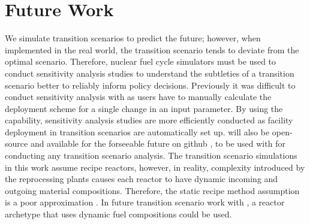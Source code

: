 \section{Future Work}
We simulate transition scenarios to predict the future; 
however, when implemented in the real world, the transition 
scenario tends to deviate from the optimal scenario.
Therefore, nuclear fuel cycle simulators must be used to conduct
sensitivity analysis studies to understand the subtleties of 
a transition scenario better to reliably inform policy decisions.
Previously it was difficult to conduct sensitivity analysis with \Cyclus 
as users have to manually calculate the deployment scheme for a 
single change in an input parameter. 
By using the \deploy capability,
sensitivity analysis studies are more efficiently 
conducted as facility deployment in transition scenarios 
are automatically set up. 
\deploy will also be open-source and available for the forseeable future on github 
\cite{chee_arfc/d3ploy:_2019}, to be used with \Cyclus for conducting any 
transition scenario analysis. 
The transition scenario simulations in this work assume recipe reactors, 
however, in reality, complexity introduced by the reprocessing plants causes 
each reactor to have dynamic incoming and outgoing material compositions. 
Therefore, the static recipe method assumption is a poor approximation 
\cite{bae_neural_2019,peterson-droogh_value_2018}. 
In future transition scenario work with \deploy, a \Cyclus 
reactor archetype that uses dynamic fuel compositions could be used. 
